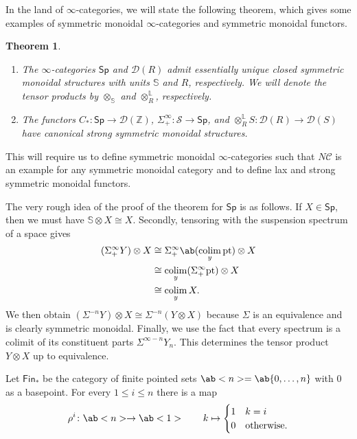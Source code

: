 \documentclass[10pt, oneside]{memoir}
\newtheorem{thm}{Theorem}[subsection]
\theoremstyle{definition}
\theoremstyle{remark}
\theoremstyle{plain}
\theoremstyle{definition}
\theoremstyle{remark}
\newcommand{\Z}{\mathbb{Z}}
\newcommand{\bS}{\mathbb{S}}
\renewcommand{\L}{\mathbb{L}}
\newcommand{\mc}[1]{\mathcal{#1}}
\newcommand{\mr}[1]{\mathrm{#1}}
\newcommand{\ms}[1]{\mathsf{#1}}
\newcommand{\1}{\mathbf{1}}
\newcommand{\2}{\mathbf{2}}
\newcommand{\3}{\mathbf{3}}
\newcommand{\pt}{\mr{pt}}
\DeclareMathOperator*{\colim}{colim}
\begin{document}
In the land of \(\infty \)-categories, we will state the following theorem, which gives some examples of symmetric monoidal \(\infty \)-categories and symmetric monoidal functors.
\begin{thm}\label{thm:symmetricmonoidal}\leavevmode
    \begin{enumerate}
        \item The \(\infty \)-categories \(\ms{Sp} \) and \(\mc{D}(R) \) admit essentially unique closed symmetric monoidal structures with units \(\bS \) and \(R \), respectively. We will denote the tensor products by \(\otimes_{\bS} \) and \(\otimes_R^{\L} \), respectively.
        \item The functors \(C_* \colon \ms{Sp} \to \mc{D}(\Z) \), \(\Sigma_+^{\infty} \colon \mc{S} \to \ms{Sp} \), and \(\otimes_R^{\L} S \colon \mc{D}(R) \to \mc{D}(S) \) have canonical strong symmetric monoidal structures.
    \end{enumerate}
\end{thm}

This will require us to define symmetric monoidal \(\infty \)-categories such that \(N\mc{C} \) is an example for any symmetric monoidal category and to define lax and strong symmetric monoidal functors.

The very rough idea of the proof of the theorem for \(\ms{Sp} \) is as follows. If \(X \in \ms{Sp} \), then we must have \(\bS \otimes X \cong X \). Secondly, tensoring with the suspension spectrum of a space gives
\begin{align*}
    (\Sigma_+^{\infty} Y) \otimes X &\cong \Sigma_+^{\infty} \ab(\colim_y \pt) \otimes X \\
    &\cong \colim_y (\Sigma_+^{\infty} \pt) \otimes X \\
    &\cong \colim_y X.
\end{align*}
We then obtain \((\Sigma^{-n} Y) \otimes X \cong \Sigma^{-n} (Y \otimes X) \) because \(\Sigma \) is an equivalence and is clearly symmetric monoidal. Finally, we use the fact that every spectrum is a colimit of its constituent parts \(\Sigma^{\infty -n} Y_n \). This determines the tensor product \(Y \otimes X \) up to equivalence.

Let \(\ms{Fin}_* \) be the category of finite pointed sets \(\ab<n> = \ab\{0, \ldots, n \} \) with \(0 \) as a basepoint. For every \(1 \leq i \leq n \) there is a map
\[ \rho^i \colon \ab<n> \to \ab<1> \qquad k \mapsto \begin{cases}
    1 & k=i \\
    0 & \text{otherwise}.
\end{cases} \]
\end{document}

